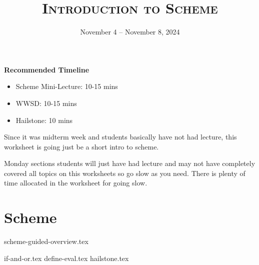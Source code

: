 \documentclass{exam}
\title{\textsc{Introduction to Scheme}}
\date{November 4 -- November 8, 2024}
\begin{document}
\maketitle
\begin{guide}
    \textbf{Recommended Timeline}
    \begin{itemize}
      \item Scheme Mini-Lecture: 10-15 mins
      \item WWSD: 10-15 mins
      \item Hailstone: 10 mins
    \end{itemize}

\begin{meta}
    Since it was midterm week and students basically have not had lecture, this worksheet is going just be a short intro to scheme. 
    
    Monday sections students will just have had lecture and may not have completely covered all topics on this worksheets so go slow as you need. There is plenty of time allocated in the worksheet for going slow.
\end{meta}
\end{guide}


\section{Scheme}
{scheme-guided-overview.tex}
\begin{questions}
    {if-and-or.tex}
    {define-eval.tex}
    {hailstone.tex}
\end{questions}
\end{document}
